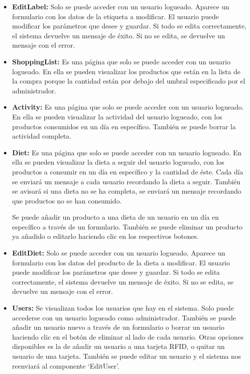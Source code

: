 \begin{itemize}
    \item \textbf{EditLabel:} Solo se puede acceder con un usuario logueado. Aparece un formulario con los datos de la etiqueta a modificar. El usuario puede modificar los parámetros que desee y guardar. Si todo se edita correctamente, el sistema devuelve un mensaje de éxito. Si no se edita, se devuelve un mensaje con el error.
    
    \item \textbf{ShoppingList:} Es una página que solo se puede acceder con un usuario logueado. En ella se pueden visualizar los productos que están en la lista de la compra porque la cantidad están por debajo del umbral especificado por el administrador.
    
    \item \textbf{Activity:} Es una página que solo se puede acceder con un usuario logueado. En ella se pueden visualizar la actividad del usuario logueado, con los productos consumidos en un día en específico. También se puede borrar la actividad completa.
    
    \item \textbf{Diet:} Es una página que solo se puede acceder con un usuario logueado. En ella se pueden visualizar la dieta a seguir del usuario logueado, con los productos a consumir en un día en específico y la cantidad de éste. Cada día se enviará un mensaje a cada usuario recordando la dieta a seguir. También se avisará si una dieta no se ha completa, se enviará un mensaje recordando que productos no se han consumido.
    
    Se puede añadir un producto a una dieta de un usuario en un día en específico a través de un formulario. También se puede eliminar un producto ya añadido o editarlo haciendo clic en los respectivos botones.
    
    \item \textbf{EditDiet:} Solo se puede acceder con un usuario logueado. Aparece un formulario con los datos del producto de la dieta a modificar. El usuario puede modificar los parámetros que desee y guardar. Si todo se edita correctamente, el sistema devuelve un mensaje de éxito. Si no se edita, se devuelve un mensaje con el error.
    
    \item \textbf{Users:} Se visualizan todos los usuarios que hay en el sistema. Solo puede accederse con un usuario logueado como administrador. También se puede añadir un usuario nuevo a través de un formulario o borrar un usuario haciendo clic en el botón de eliminar al lado de cada usuario. Otras opciones disponibles es la de añadir un usuario a una tarjeta RFID, o quitar un usuario de una tarjeta. También se puede editar un usuario y el sistema nos reenviará al componente ‘EditUser’.
    

\end{itemize}
